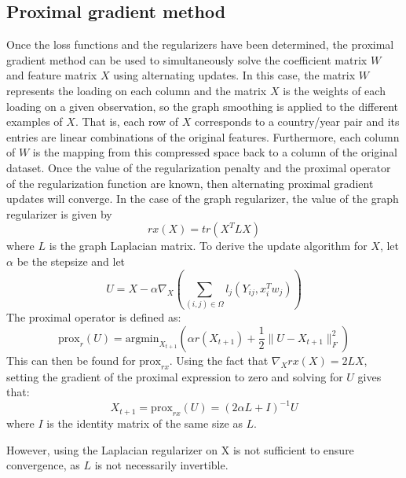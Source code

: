\documentclass[a4paper]{article}
\begin{document}
\subsection{Proximal gradient method}
Once the loss functions and the regularizers have been determined, the proximal gradient method can be used to simultaneously solve the coefficient matrix $W$ and feature matrix $X$ using alternating updates. In this case, the matrix $W$ represents the loading on each column and the matrix $X$ is the weights of each loading on a given observation, so the graph smoothing is applied to the different examples of $X$. That is, each row of $X$ corresponds to a country/year pair and its entries are linear combinations of the original features. Furthermore, each column of $W$ is the mapping from this compressed space back to a column of the original dataset. Once the value of the regularization penalty and the proximal operator of the regularization function are known, then alternating proximal gradient updates will converge. In the case of the graph regularizer, the value of the graph regularizer is given by 
\begin{equation*}
rx(X) = tr(X^T L X)
\end{equation*}
where $L$ is the graph Laplacian matrix. To derive the update algorithm for $X$, let $\alpha$ be the stepsize and let
\begin{equation*}
U = X - \alpha\nabla_X(\sum_{(i,j)\in \Omega}l_j(Y_{ij},x_i^Tw_j))
\end{equation*}
The proximal operator is defined as:
\begin{equation*}
\text{prox}_r(U) = \text{argmin}_{X_{t+1}}( \alpha r(X_{t+1}) + \frac{1}{2}\|U - X_{t+1}\|_F^2)
\end{equation*}
This can then be found for $\text{prox}_{rx}$. Using the fact that $\nabla_X rx(X) = 2LX$, setting the gradient of the proximal expression to zero and solving for $U$ gives that:
\begin{equation*}
X_{t+1} = \text{prox}_{rx}(U) = (2\alpha L + I)^{-1}U
\end{equation*}
where $I$ is the identity matrix of the same size as $L$. 

However, using the Laplacian regularizer on X is not sufficient to ensure convergence, as $L$ is not necessarily invertible. 
\end{document}
